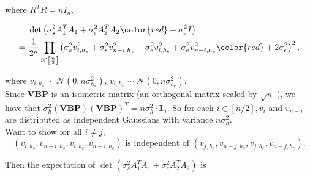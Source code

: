 \documentclass[12pt]{article}
\begin{document}
where $R^{T}R=nI_n$.

\begin{align*}
    \quad&\det\left( \sigma_{s}^2A_{1}^{T}A_{1}+\sigma_{e}^2A_{2}^{T}A_{2} {\color{red}+\sigma_\epsilon^2 I}\right) \\
    =\,\,& \frac{1}{2^n} \prod_{i\in\left[ \frac{n}{2} \right]}\left( \sigma_{s}^2v_{i,h_{s}}^2+\sigma_{s}^2v_{n-i,h_{s}}^2+\sigma_{e}^2v_{i,h_{e}}^2+\sigma_{e}^2v_{n-i,h_{e}}^2 {\color{red} + 2\sigma_\epsilon^2} \right)^2 ,
\end{align*}

where $v_{i,h_{s}}\sim \mathcal{N}\left( 0,n\sigma_{h_{s}}^2 \right)$, $v_{i,h_{e}}\sim \mathcal{N}\left( 0,n\sigma_{h_{e}}^2 \right)$.\\ 



Since $\mathbf{V B P}$ is an isometric matrix (an orthogonal matrix scaled by $\sqrt{n}$ ), we have that $\sigma_h^2(\mathbf{V B P})(\mathbf{V B P})^T=n \sigma_h^2 \cdot \mathbf{I}_n$. So for each $i \in[n / 2], v_i$ and $v_{n-i}$ are distributed as independent Gaussians with variance $n \sigma_h^2$. \\


Want to show for all $i\neq j$,
$$
\left( v_{i,h_{s}},v_{n-i,h_{s}},v_{i,h_{e}},v_{n-i,h_{e}}\right)\text{ is independent of }\left( v_{j,h_{s}},v_{n-j,h_{s}},v_{j,h_{e}},v_{n-j,h_{e}}\right).
$$

Then the expectation of $\det\left( \sigma_{s}^2A_{1}^{T}A_{1}+\sigma_{e}^2A_{2}^{T}A_{2} \right)$ is
\end{document}
